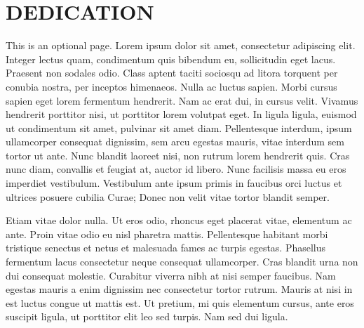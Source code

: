 %
%
%

\chapter*{DEDICATION}



\indent This is an optional page.  Lorem ipsum dolor sit amet, consectetur adipiscing elit. Integer lectus quam, condimentum quis bibendum eu, sollicitudin eget lacus. Praesent non sodales odio. Class aptent taciti sociosqu ad litora torquent per conubia nostra, per inceptos himenaeos. Nulla ac luctus sapien. Morbi cursus sapien eget lorem fermentum hendrerit. Nam ac erat dui, in cursus velit. Vivamus hendrerit porttitor nisi, ut porttitor lorem volutpat eget. In ligula ligula, euismod ut condimentum sit amet, pulvinar sit amet diam. Pellentesque interdum, ipsum ullamcorper consequat dignissim, sem arcu egestas mauris, vitae interdum sem tortor ut ante. Nunc blandit laoreet nisi, non rutrum lorem hendrerit quis. Cras nunc diam, convallis et feugiat at, auctor id libero. Nunc facilisis massa eu eros imperdiet vestibulum. Vestibulum ante ipsum primis in faucibus orci luctus et ultrices posuere cubilia Curae; Donec non velit vitae tortor blandit semper.

Etiam vitae dolor nulla. Ut eros odio, rhoncus eget placerat vitae, elementum ac ante. Proin vitae odio eu nisl pharetra mattis. Pellentesque habitant morbi tristique senectus et netus et malesuada fames ac turpis egestas. Phasellus fermentum lacus consectetur neque consequat ullamcorper. Cras blandit urna non dui consequat molestie. Curabitur viverra nibh at nisi semper faucibus. Nam egestas mauris a enim dignissim nec consectetur tortor rutrum. Mauris at nisi in est luctus congue ut mattis est. Ut pretium, mi quis elementum cursus, ante eros suscipit ligula, ut porttitor elit leo sed turpis. Nam sed dui ligula.


\pagebreak{}
